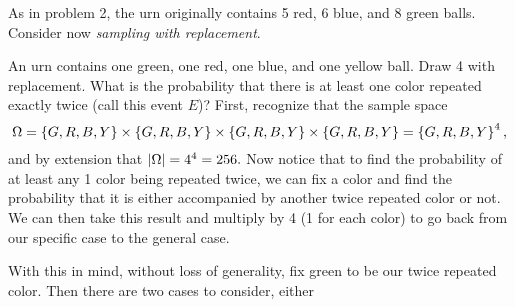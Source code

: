 \documentclass{exam}
\begin{document}
\begin{questions}
\begin{parts}
\end{parts}

\newpage
\question
As in problem 2, the urn originally contains 5 red, 6 blue, and 8 green balls. Consider now \textit{sampling with replacement}.




\newpage
\question
An urn contains one green, one red, one blue, and one yellow ball. Draw 4 with replacement. What is the probability that there is at least one color repeated exactly twice (call this event $E$)?
\sol
First, recognize that the sample space 
$$\Omega = \left \{ G, R, B, Y \right \} \times \left \{ G, R, B, Y \right \} \times \left \{ G, R, B, Y \right \} \times  \left \{ G, R, B, Y \right \} = \left \{ G, R, B, Y \right \}^4,$$
and by extension that $\left| \Omega \right| = 4^4 = 256.$ Now notice that to find the probability of at least any 1 color being repeated twice, we can fix a color and find the probability that it is either accompanied by another twice repeated color or not. We can then take this result and multiply by 4 (1 for each color) to go back from our specific case to the general case.

\newline

With this in mind, without loss of generality, fix green to be our twice repeated color. Then there are two cases to consider, either
\end{questions}
\end{document}
